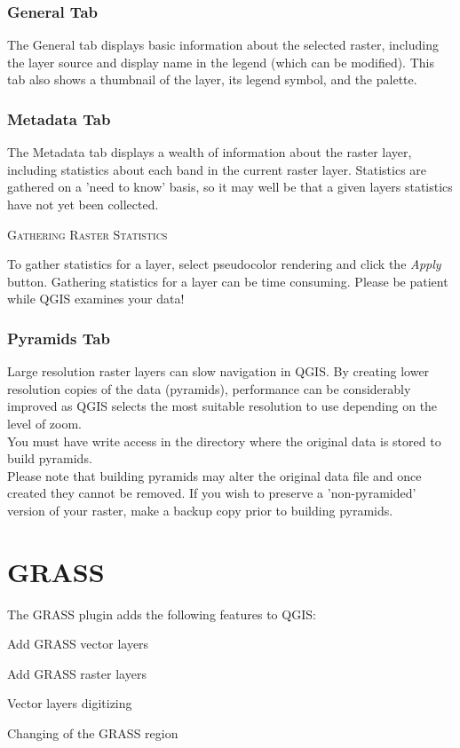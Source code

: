 \documentclass[10pt,english]{article}
\newcommand\qgistip[1]{\raggedright\small{#1}}
\begin{document}
\begin{onehalfspace}
\subsubsection{General Tab}
The General tab displays basic information about the selected raster, including the layer source and  display name in the legend (which can be modified). This tab also shows a thumbnail of the layer, its legend symbol, and the palette.

\subsubsection{Metadata Tab}
The Metadata tab displays a wealth of information about the raster layer, including statistics about each band in the current raster layer. Statistics are gathered on a 'need to know' basis, so it may well be that a given layers statistics have not yet been collected.


\begin{Tip}\caption{\textsc{Gathering Raster Statistics}}
\qgistip{To gather statistics for a layer, select pseudocolor rendering and click the \textsl{Apply} button. Gathering statistics for a layer can be time consuming. Please be patient while QGIS examines your data!
}
\end{Tip}
\subsubsection{Pyramids Tab}
Large resolution raster layers can slow navigation in QGIS. By creating lower resolution copies of the data (pyramids), performance can be considerably improved as QGIS selects the most suitable resolution to use depending on the level of zoom. \\

You must have write access in the directory where the original data is stored to build pyramids. \\

Please note that building pyramids may alter the original data file and once created they cannot be removed. If you wish to preserve a 'non-pyramided' version of your raster, make a backup copy prior to building pyramids.
\section{GRASS}\label{sec:grass}
The GRASS plugin adds the following features to QGIS:
\begin{compactitem}
\item Add GRASS vector layers
\item Add GRASS raster layers
\item Vector layers digitizing
\item Changing of the GRASS region
\end{compactitem}

\end{onehalfspace}
\end{document}
